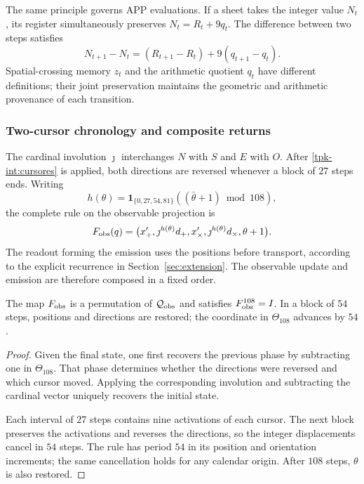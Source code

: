 The same principle governs APP evaluations. If a sheet takes the
integer value \(N_t\), its register simultaneously preserves
\(N_t=R_t+9q_t\). The difference between two steps satisfies
\[
 N_{t+1}-N_t=(R_{t+1}-R_t)+9(q_{t+1}-q_t).
\]
Spatial-crossing memory \(z_t\) and the arithmetic quotient \(q_t\)
have different definitions; their joint preservation maintains the
geometric and arithmetic provenance of each transition.

\subsubsection{Two-cursor chronology and composite returns}
\label{tpk-int:cronologia}

The cardinal involution \(\jmath\) interchanges \(N\) with \(S\) and
\(E\) with \(O\). After \eqref{tpk-int:cursores} is applied, both
directions are reversed whenever a block of \(27\) steps ends.
Writing
\[
 h(\theta)=\mathbf1_{\{0,27,54,81\}}
             ((\bar\theta+1)\bmod108),
\]
the complete rule on the observable projection is
\begin{equation}
 F_{\rm obs}(q)=
 \bigl(x_+',\jmath^{h(\theta)}d_+,
       x_\times',\jmath^{h(\theta)}d_\times,
       \theta+1\bigr).
 \label{tpk-int:fobs}
\end{equation}
The readout forming the emission uses the positions before
transport, according to the explicit recurrence in
Section~\ref{sec:extension}. The observable update and emission
are therefore composed in a fixed order.

\begin{proposition}
\label{tpk-int:periodo}
The map \(F_{\rm obs}\) is a permutation of
\(\mathcal Q_{\rm obs}\) and satisfies \(F_{\rm obs}^{108}=I\).
In a block of \(54\) steps, positions and directions are restored;
the coordinate in \(\Theta_{108}\) advances by \(54\).
\end{proposition}
\begin{proof}
Given the final state, one first recovers the previous phase by subtracting one
in \(\Theta_{108}\). That phase determines whether the
directions were reversed and which cursor moved. Applying the corresponding involution
and subtracting the cardinal vector uniquely recovers the initial state.

Each interval of \(27\) steps contains nine activations of each
cursor. The next block preserves the activations and reverses the
directions, so the integer displacements cancel in
\(54\) steps. The rule has period \(54\) in its position
and orientation increments; the same cancellation holds for any calendar
origin. After \(108\) steps, \(\theta\) is also restored.
\end{proof}

